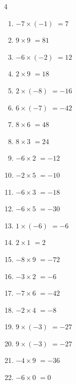 \begin{multicols}{4}
\begin{enumerate}
  \item $-7\times (-1)$
        $=7$

  \item $9\times 9$
        $=81$

  \item $-6\times (-2)$
        $=12$

  \item $2\times 9$
        $=18$

  \item $2\times (-8)$
        $=-16$

  \item $6\times (-7)$
        $=-42$

  \item $8\times 6$
        $=48$

\columnbreak %

  \item $8\times 3$
        $=24$

  \item $-6\times 2$
        $=-12$

  \item $-2\times 5$
        $=-10$

  \item $-6\times 3$
        $=-18$

  \item $-6\times 5$
        $=-30$

  \item $1\times (-6)$
        $=-6$

  \item $2\times 1$
        $=2$

  \item $-8\times 9$
        $=-72$

  \item $-3\times 2$
        $=-6$

  \item $-7\times 6$
        $=-42$

  \item $-2\times 4$
        $=-8$

  \item $9\times (-3)$
        $=-27$

  \item $9\times (-3)$
        $=-27$

  \item $-4\times 9$
        $=-36$

  \item $-6\times 0$
        $=0$


\end{enumerate}
\end{multicols}
